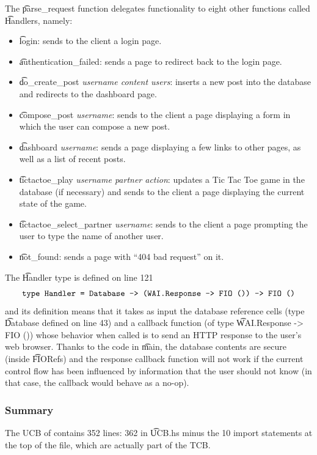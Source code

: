 \begin{refsection}
The \t{parse\_request} function delegates functionality to eight other functions called \t{Handler}s, namely:
\begin{itemize}
  \item
    \t{login}: sends to the client a login page.
  \item
    \t{authentication\_failed}: sends a page to redirect back to the login page.
  \item
    \t{do\_create\_post} \textit{username content users}: inserts a new post into the database and redirects to the dashboard page.
  \item
    \t{compose\_post} \textit{username}: sends to the client a page displaying a form in which the user can compose a new post.
  \item
    \t{dashboard} \textit{username}: sends a page displaying a few links to other pages, as well as a list of recent posts.
  \item
    \t{tictactoe\_play} \textit{username partner action}: updates a Tic Tac Toe game in the database (if necessary)
    and sends to the client a page displaying the current state of the game.
  \item
    \t{tictactoe\_select\_partner} \textit{username}: sends to the client a page prompting the user to type the name of another user.
  \item
    \t{not\_found}: sends a page with ``404 bad request'' on it.
\end{itemize}
The \t{Handler} type is defined on line 121
\[
  \texttt{type Handler = Database -> (WAI.Response -> FIO ()) -> FIO ()}
\]
and its definition means that it takes as input the database reference cells
(type \t{Database} defined on line 43)
and a callback function (of type \t{WAI.Response -> FIO ()})
whose behavior when called is to send an HTTP response to the user's web browser.
%
Thanks to the code in \t{main},
the database contents are secure (inside \t{FIORef}s)
and the response callback function will not work if the current control flow has been influenced by information that the user should not know
(in that case, the callback would behave as a no-op).

\subsubsection{Summary}

The UCB of \myapp{} \viF{} contains 352 lines: 362 in \t{UCB.hs} minus the 10 import statements at the top of the file,
which are actually part of the TCB.


\end{refsection}
